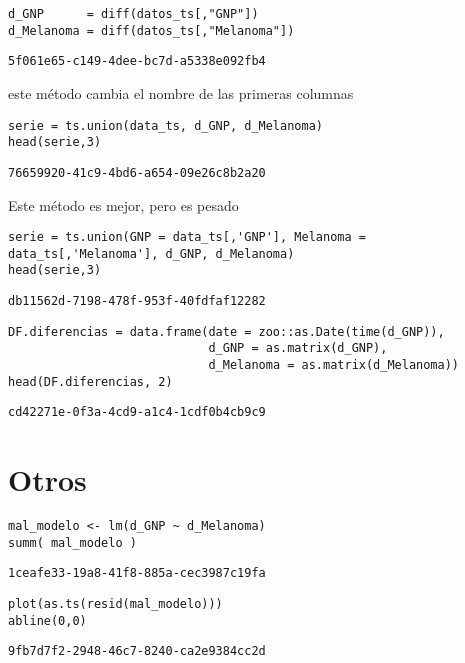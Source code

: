 \documentclass[11pt]{article}
\begin{document}
\begin{verbatim}
d_GNP      = diff(datos_ts[,"GNP"])
d_Melanoma = diff(datos_ts[,"Melanoma"])
\end{verbatim}

\label{}
\begin{verbatim}
5f061e65-c149-4dee-bc7d-a5338e092fb4
\end{verbatim}


este método cambia el nombre de las primeras columnas

\begin{verbatim}
serie = ts.union(data_ts, d_GNP, d_Melanoma)
head(serie,3)
\end{verbatim}

\label{}
\begin{verbatim}
76659920-41c9-4bd6-a654-09e26c8b2a20
\end{verbatim}


Este método es mejor, pero es pesado
\begin{verbatim}
serie = ts.union(GNP = data_ts[,'GNP'], Melanoma = data_ts[,'Melanoma'], d_GNP, d_Melanoma)
head(serie,3)
\end{verbatim}

\label{}
\begin{verbatim}
db11562d-7198-478f-953f-40fdfaf12282
\end{verbatim}


\begin{verbatim}
DF.diferencias = data.frame(date = zoo::as.Date(time(d_GNP)),
                            d_GNP = as.matrix(d_GNP),
                            d_Melanoma = as.matrix(d_Melanoma))
head(DF.diferencias, 2)
\end{verbatim}

\label{}
\begin{verbatim}
cd42271e-0f3a-4cd9-a1c4-1cdf0b4cb9c9
\end{verbatim}
\section{Otros}
\label{sec:org49630d6}

\begin{verbatim}
mal_modelo <- lm(d_GNP ~ d_Melanoma)
summ( mal_modelo )
\end{verbatim}

\label{}
\begin{verbatim}
1ceafe33-19a8-41f8-885a-cec3987c19fa
\end{verbatim}


\begin{verbatim}
plot(as.ts(resid(mal_modelo))) 
abline(0,0) 
\end{verbatim}

\label{}
\begin{verbatim}
9fb7d7f2-2948-46c7-8240-ca2e9384cc2d
\end{verbatim}
\end{document}
